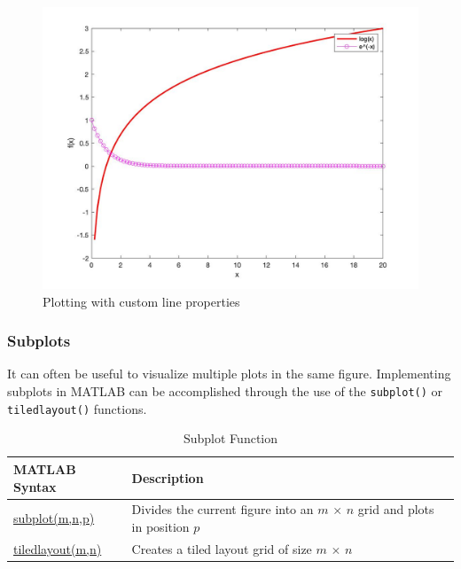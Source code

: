 \documentclass[../MATLAB_Primer.tex]{subfiles}
\begin{document}
\begin{figure}[H]
    \centering
    \includegraphics[width=350pt]{images/plotting_example4.jpg}
    \caption{Plotting with custom line properties}
    \label{fig:plotting_example4}
\end{figure}

\subsubsection{Subplots}
It can often be useful to visualize multiple plots in the same figure.  Implementing subplots in MATLAB can be accomplished through the use of the \texttt{subplot()} or \texttt{tiledlayout()} functions.\\

\begin{table}[H]
\caption{Subplot Function}
    \begin{center}
        \begin{tabular}{| C{3cm} | m{12cm}|}
            \hline
            \textbf{MATLAB Syntax} & \textbf{Description}\\
            
            \hline
            \href{https://www.mathworks.com/help/matlab/ref/subplot.html}{\color{blue}subplot(m,n,p)} & Divides the current figure into an $m$ $\times$ $n$ grid and plots in position $p$ \\
            \hline
            \href{https://www.mathworks.com/help/matlab/ref/subplot.html}{\color{blue}tiledlayout(m,n)} & Creates a tiled layout grid of size $m$ $\times$ $n$ \\
            \hline
        \end{tabular}
        \label{tab:subplotting}
    \end{center}
\end{table}
\end{document}
